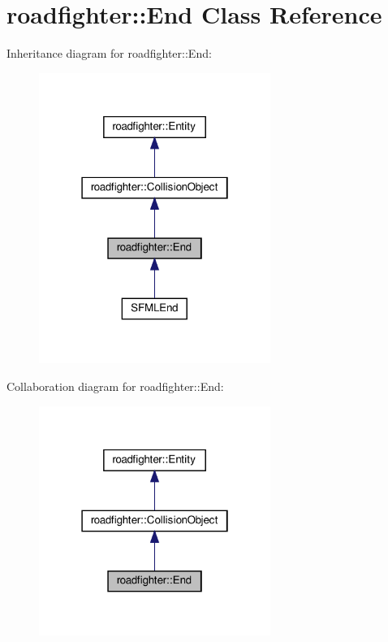 \hypertarget{classroadfighter_1_1End}{}\section{roadfighter\+:\+:End Class Reference}
\label{classroadfighter_1_1End}


Inheritance diagram for roadfighter\+:\+:End\+:\nopagebreak
\begin{figure}[H]
\begin{center}
\leavevmode
\includegraphics[width=214pt]{classroadfighter_1_1End__inherit__graph}
\end{center}
\end{figure}


Collaboration diagram for roadfighter\+:\+:End\+:\nopagebreak
\begin{figure}[H]
\begin{center}
\leavevmode
\includegraphics[width=214pt]{classroadfighter_1_1End__coll__graph}
\end{center}
\end{figure}
